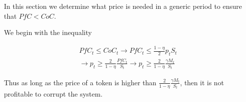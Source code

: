 
In this section we determine what price is needed in a generic period to ensure that $PfC < CoC$.

We begin with the inequality

\begin{align*}
  PfC_t \leq CoC_t \rightarrow PfC_t \leq \frac{1 - \eta}{2} p_t S_t \\
  \rightarrow p_t \geq \frac{2}{1 - \eta} \frac{PfC_t}{S_t}
  \rightarrow p_t \geq \frac{2}{1 - \eta} \frac{\gamma M_t}{S_t}
\end{align*}

Thus as long as the price of a token is higher than $\frac{2}{1 - \eta} \frac{\gamma M_t}{S_t}$,
then it is not profitable to corrupt the system.
